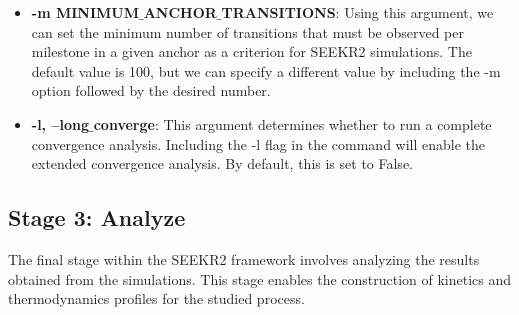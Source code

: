 \documentclass[9pt,training,pubversion]{livecoms}
\begin{document}
\begin{tcolorbox}[colback=black!8!white, colframe=black!50!black, fontlower=\tiny, left=0pt, right=10pt, top=2pt, bottom=2pt]
\begin{itemize}
\item \textbf{-m MINIMUM$\_$ANCHOR$\_$TRANSITIONS}: Using this argument, we can set the minimum number of transitions that must be observed per milestone in a given anchor as a criterion for SEEKR2 simulations. The default value is 100, but we can specify a different value by including the -m option followed by the desired number.

\item \textbf{-l, --long$\_$converge}: This argument determines whether to run a complete convergence analysis. Including the -l flag in the command will enable the extended convergence analysis. By default, this is set to False.

\end{itemize}
\end{tcolorbox}


\subsection*{Stage 3: Analyze}
\vspace{2mm}

\noindent The final stage within the SEEKR2 framework involves analyzing the results obtained from the simulations. This stage enables the construction of kinetics and thermodynamics profiles for the studied process.
\end{document}
